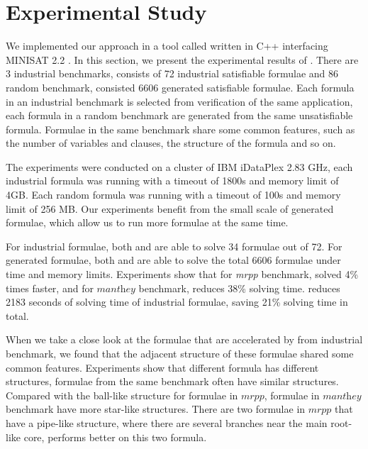 \section{Experimental Study}\label{sec:expr}
We implemented our approach in a tool called \tool written in C++ interfacing MINISAT 2.2 \cite{MINISAT}.
In this section, we present the experimental results of \tool.
There are 3 industrial benchmarks, consists of 72 industrial satisfiable formulae and 86 random benchmark, consisted 6606 generated satisfiable formulae. Each formula in an industrial benchmark is selected from verification of the same application, each formula in a random benchmark are generated from the same unsatisfiable formula. Formulae in the same benchmark share some common features, such as the number of variables and clauses, the structure of the formula and so on.

The experiments were conducted on a cluster of IBM iDataPlex 2.83 GHz, each industrial formula was running with a timeout of 1800s and memory limit of 4GB. Each random formula was running with a timeout of 100s and memory limit of 256 MB. Our experiments benefit from the small scale of generated formulae, which allow us to run more formulae at the same time.

For industrial formulae, both \tool and \minibones are able to solve 34 formulae out of 72. For generated formulae, both \tool and \minibones are able to solve the total 6606 formulae under time and memory limits.
Experiments show that for \textit{mrpp} benchmark, \minibones solved 4\% times faster, and for $\textit{manthey}$ benchmark, \tool reduces 38\% solving time. \tool reduces 2183 seconds of solving time of industrial formulae, saving 21\% solving time in total.

When we take a close look at the formulae that are accelerated by \tool from industrial benchmark, we found that the adjacent structure of these formulae shared some common features. Experiments show that different formula has different structures, formulae from the same benchmark often have similar structures. Compared with the ball-like structure for formulae in $\textit{mrpp}$, formulae in $\textit{manthey}$ benchmark have more star-like structures. There are two formulae in $\textit{mrpp}$ that have a pipe-like structure, where there are several branches near the main root-like core, \tool performs better on this two formula.

